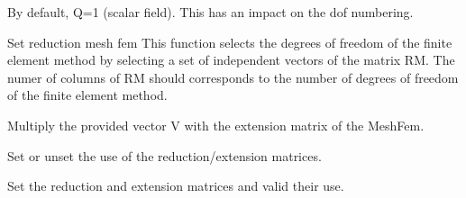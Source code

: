 \documentclass[a4paper,11pt,english]{sphinxmanual}
\begin{document}
\begin{fulllineitems}
\begin{fulllineitems}
By default, Q=1 (scalar field). This has an impact on the dof numbering.

\end{fulllineitems}


\begin{fulllineitems}
\label{\detokenize{python/cmdref_MeshFem:getfem.MeshFem.reduce_meshfem}}
Set reduction mesh fem
This function selects the degrees of freedom of the finite element
method by selecting a set of independent vectors of the matrix RM.
The numer of columns of RM should corresponds to the number of degrees
of freedom of the finite element method.

\end{fulllineitems}


\begin{fulllineitems}
\label{\detokenize{python/cmdref_MeshFem:getfem.MeshFem.reduce_vector}}
Multiply the provided vector V with the extension matrix of the MeshFem.

\end{fulllineitems}


\begin{fulllineitems}
\label{\detokenize{python/cmdref_MeshFem:getfem.MeshFem.reduction}}
Set or unset the use of the reduction/extension matrices.

\end{fulllineitems}


\begin{fulllineitems}
\label{\detokenize{python/cmdref_MeshFem:getfem.MeshFem.reduction_matrices}}
Set the reduction and extension matrices and valid their use.


\end{fulllineitems}
\end{fulllineitems}
\end{document}
